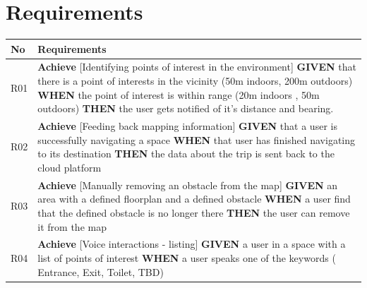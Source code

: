 \documentclass[prodmode,acmtosem]{acmsmall} %
\begin{document}
\section{Requirements}
\begin{center}
\def\arraystretch{1.5}
\begin{tabularx}{\textwidth}{| p{1.5em} | X |} 
 \hline
 
No & Requirements \\
 \hline
 R01 & 
 		\textbf{Achieve} [Identifying points of interest in the environment]\newline\newline
 		\textbf{GIVEN} that there is a point of interests in the vicinity (50m indoors, 200m outdoors)\newline
		\textbf{WHEN} the point of interest is within range (20m indoors , 50m outdoors)\newline
		\textbf{THEN} the user gets notified of it’s distance and bearing.\\
 \hline
 R02 & 
 		\textbf{Achieve} [Feeding back mapping information]\newline\newline
 		\textbf{GIVEN} that a user is successfully navigating a space\newline
		\textbf{WHEN} that user has finished navigating to its destination\newline
		\textbf{THEN} the data about the trip is sent back to the cloud platform \\
 \hline
 R03 & 
 		\textbf{Achieve} [Manually removing an obstacle from the map]\newline\newline
 		\textbf{GIVEN} an area with a defined floorplan and a defined obstacle\newline
		\textbf{WHEN} a user find that the defined obstacle is no longer there\newline
		\textbf{THEN} the user can remove it from the map \\ 
 \hline
 R04 & 
 		\textbf{Achieve} [Voice interactions - listing]\newline\newline
 		\textbf{GIVEN} a user in a space with a list of points of interest\newline
		\textbf{WHEN} a user speaks one of the keywords ( Entrance, Exit, Toilet, TBD)\newline

\end{tabularx}
\end{center}
\end{document}
